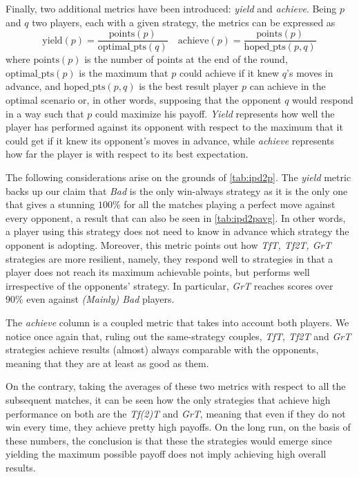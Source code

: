 \documentclass[journal,10pt,twoside]{IEEEtran}
\begin{document}
Finally, two additional metrics have been introduced: \textit{yield} and \textit{achieve}. 
Being $p$ and $q$ two players, each with a given strategy, the metrics can be expressed as
$$
\mathrm{yield}(p) = \frac{\mathrm{points}(p)}{\mathrm{optimal\_pts}(q)} \quad
\mathrm{achieve}(p) = \frac{\mathrm{points}(p)}{\mathrm{hoped\_pts}(p,q)}
$$
where $\mathrm{points}(p)$ is the number of points at the end of the round,
$\mathrm{optimal\_pts}(p)$ is the maximum that $p$ could achieve if it knew $q$'s moves in advance, and
$\mathrm{hoped\_pts}(p,q)$ is the best result player $p$ can achieve in the optimal scenario or, in other words, supposing that the opponent $q$ would respond in a way such that $p$ could maximize his payoff.
\textit{Yield} represents how well the player has performed against its opponent with respect to the maximum that it could get if it knew its opponent's moves in advance, while \textit{achieve} represents how far the player is with respect to its best expectation.

The following considerations arise on the grounds of \autoref{tab:ipd2p}.
The \textit{yield} metric backs up our claim that \textit{Bad} is the only win-always strategy as it is the only one that gives a stunning $100\%$ for all the matches playing a perfect move against every opponent, a result that can also be seen in \autoref{tab:ipd2pavg}. In other words, a player using this strategy does not need to know in advance which strategy the opponent is adopting. Moreover, this metric points out how \textit{TfT, Tf2T, GrT} strategies are more resilient, namely, they respond well to strategies in that a player does not reach its maximum achievable points, but performs well irrespective of the opponents' strategy. In particular, \textit{GrT} reaches scores over $90\%$ even against \textit{(Mainly) Bad} players.

The \textit{achieve} column is a coupled metric that takes into account both players. We notice once again that, ruling out the same-strategy couples, \textit{TfT, Tf2T} and \textit{GrT} strategies achieve results (almost) always comparable with the opponents, meaning that they are at least as good as them.

On the contrary, taking the averages of these two metrics with respect to all the subsequent matches, it can be seen how the only strategies that achieve high performance on both are the \textit{Tf(2)T} and \textit{GrT}, meaning that even if they do not win every time, they achieve pretty high payoffs.
On the long run, on the basis of these numbers, the conclusion is that these the strategies would emerge since yielding the maximum possible payoff does not imply achieving high overall results.
\end{document}
